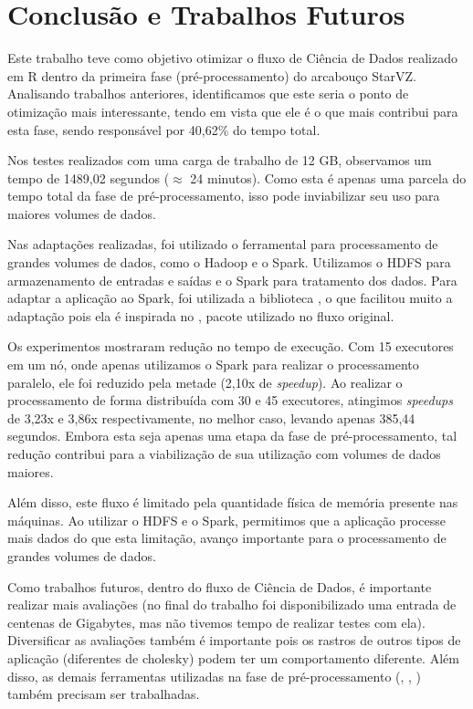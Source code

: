 \chapter{Conclusão e Trabalhos Futuros} \label{ch:conclusion}

Este trabalho teve como objetivo otimizar o fluxo de Ciência de Dados realizado 
em R dentro da primeira fase (pré-processamento) do arcabouço StarVZ. 
Analisando trabalhos anteriores, identificamos que este seria o ponto de 
otimização mais interessante, tendo em vista que ele é o que mais contribui 
para esta fase, sendo responsável por 40,62\% do tempo total.

Nos testes realizados com uma carga de trabalho de 12 GB, observamos um tempo 
de 1489,02 segundos ($\approx$ 24 minutos). Como esta é apenas uma parcela do 
tempo total da fase de pré-processamento, isso pode inviabilizar seu uso para 
maiores volumes de dados.

Nas adaptações realizadas, foi utilizado o ferramental para processamento de 
grandes volumes de dados, como o Hadoop e o Spark. Utilizamos o HDFS para 
armazenamento de entradas e saídas e o Spark para tratamento dos dados. Para 
adaptar a aplicação ao Spark, foi utilizada a biblioteca , o 
que facilitou muito a adaptação pois ela é inspirada no 
, pacote utilizado no fluxo original.

Os experimentos mostraram redução no tempo de execução. Com 15 executores 
em um nó, onde apenas utilizamos o Spark para realizar o 
processamento paralelo, ele foi reduzido pela metade (2,10x de \emph{speedup}). 
Ao realizar o processamento de forma distribuída com 30 e 45 executores, 
atingimos \emph{speedups} de 3,23x e 3,86x respectivamente, no melhor caso, 
levando apenas 385,44 segundos. Embora esta seja apenas uma etapa da fase de 
pré-processamento, tal redução contribui para a viabilização de sua utilização 
com volumes de dados maiores.

Além disso, este fluxo é limitado pela quantidade física de memória presente 
nas máquinas. Ao utilizar o HDFS e o Spark, permitimos que a aplicação processe 
mais dados do que esta limitação, avanço importante para o processamento de 
grandes volumes de dados.

Como trabalhos futuros, dentro do fluxo de Ciência de Dados, é importante 
realizar mais avaliações (no final do trabalho foi disponibilizado uma entrada 
de centenas de Gigabytes, mas não tivemos tempo de realizar testes com ela). 
Diversificar as avaliações também é importante pois os rastros de outros tipos 
de aplicação (diferentes de cholesky) podem ter um comportamento diferente. 
Além disso, as demais ferramentas utilizadas na fase de pré-processamento 
(, , ) também 
precisam ser trabalhadas.